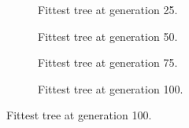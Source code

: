 \documentclass[12pt]{article}
\begin{document}
\begin{figure}[H]
    \centering
    \begin{subfigure}[t]{\textwidth}
        \centering
        \caption{Fittest tree at generation 25.}
    \end{subfigure}

    \medskip

    \begin{subfigure}[t]{\textwidth}
        \centering
        \caption{Fittest tree at generation 50.}
    \end{subfigure}

    \medskip

    \begin{subfigure}[t]{\textwidth}
        \centering
        \caption{Fittest tree at generation 75.}
    \end{subfigure}

    \medskip

    \begin{subfigure}[t]{\textwidth}
        \centering
        \caption{Fittest tree at generation 100.}
    \end{subfigure}
\end{figure}
\end{document}
